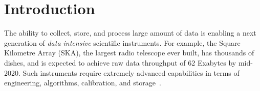 \documentclass[aoas,preprint]{imsart}
\numberwithin{equation}{section}
\theoremstyle{plain}
\begin{document}
\begin{abstract} 





\end{abstract} 

\section{Introduction}

The ability to collect, store, and process large amount of
data is enabling a next generation of {\em data intensive} scientific 
instruments. For example,
the Square Kilometre Array (SKA), the largest
radio telescope ever built, has thousands of 
dishes, and is expected to achieve
raw data throughput of 62 Exabytes by mid-2020.
Such instruments require extremely advanced  
capabilities in terms of engineering, algorithms, calibration, and storage~\cite{hu}. 

\end{document}
